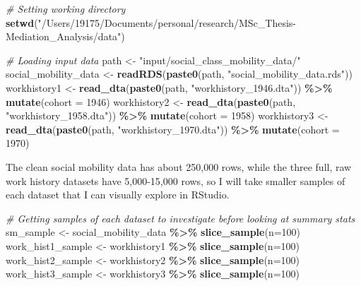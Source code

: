 \documentclass[
]{article}
\newenvironment{Shaded}{\begin{snugshade}}{\end{snugshade}}
\newcommand{\AttributeTok}[1]{\textcolor[rgb]{0.13,0.29,0.53}{#1}}
\newcommand{\CommentTok}[1]{\textcolor[rgb]{0.56,0.35,0.01}{\textit{#1}}}
\newcommand{\DecValTok}[1]{\textcolor[rgb]{0.00,0.00,0.81}{#1}}
\newcommand{\FunctionTok}[1]{\textcolor[rgb]{0.13,0.29,0.53}{\textbf{#1}}}
\newcommand{\NormalTok}[1]{#1}
\newcommand{\OtherTok}[1]{\textcolor[rgb]{0.56,0.35,0.01}{#1}}
\newcommand{\SpecialCharTok}[1]{\textcolor[rgb]{0.81,0.36,0.00}{\textbf{#1}}}
\newcommand{\StringTok}[1]{\textcolor[rgb]{0.31,0.60,0.02}{#1}}
\begin{document}
\begin{Shaded}
\begin{Highlighting}[]
\CommentTok{\# Setting working directory}
\FunctionTok{setwd}\NormalTok{(}\StringTok{"/Users/19175/Documents/personal/research/MSc\_Thesis{-}Mediation\_Analysis/data"}\NormalTok{)}

\CommentTok{\# Loading input data}
\NormalTok{path }\OtherTok{\textless{}{-}} \StringTok{"input/social\_class\_mobility\_data/"}
\NormalTok{social\_mobility\_data }\OtherTok{\textless{}{-}} \FunctionTok{readRDS}\NormalTok{(}\FunctionTok{paste0}\NormalTok{(path, }\StringTok{"social\_mobility\_data.rds"}\NormalTok{))}
\NormalTok{workhistory1 }\OtherTok{\textless{}{-}} \FunctionTok{read\_dta}\NormalTok{(}\FunctionTok{paste0}\NormalTok{(path, }\StringTok{"workhistory\_1946.dta"}\NormalTok{)) }\SpecialCharTok{\%\textgreater{}\%}
  \FunctionTok{mutate}\NormalTok{(}\AttributeTok{cohort =} \DecValTok{1946}\NormalTok{)}
\NormalTok{workhistory2 }\OtherTok{\textless{}{-}} \FunctionTok{read\_dta}\NormalTok{(}\FunctionTok{paste0}\NormalTok{(path, }\StringTok{"workhistory\_1958.dta"}\NormalTok{)) }\SpecialCharTok{\%\textgreater{}\%}
  \FunctionTok{mutate}\NormalTok{(}\AttributeTok{cohort =} \DecValTok{1958}\NormalTok{)}
\NormalTok{workhistory3 }\OtherTok{\textless{}{-}} \FunctionTok{read\_dta}\NormalTok{(}\FunctionTok{paste0}\NormalTok{(path, }\StringTok{"workhistory\_1970.dta"}\NormalTok{)) }\SpecialCharTok{\%\textgreater{}\%}
  \FunctionTok{mutate}\NormalTok{(}\AttributeTok{cohort =} \DecValTok{1970}\NormalTok{)}
\end{Highlighting}
\end{Shaded}

The clean social mobility data has about 250,000 rows, while the three
full, raw work history datasets have 5,000-15,000 rows, so I will take
smaller samples of each dataset that I can visually explore in RStudio.

\begin{Shaded}
\begin{Highlighting}[]
\CommentTok{\# Getting samples of each dataset to investigate before looking at summary stats}
\NormalTok{sm\_sample }\OtherTok{\textless{}{-}}\NormalTok{ social\_mobility\_data }\SpecialCharTok{\%\textgreater{}\%} \FunctionTok{slice\_sample}\NormalTok{(}\AttributeTok{n=}\DecValTok{100}\NormalTok{)}
\NormalTok{work\_hist1\_sample }\OtherTok{\textless{}{-}}\NormalTok{ workhistory1 }\SpecialCharTok{\%\textgreater{}\%} \FunctionTok{slice\_sample}\NormalTok{(}\AttributeTok{n=}\DecValTok{100}\NormalTok{)}
\NormalTok{work\_hist2\_sample }\OtherTok{\textless{}{-}}\NormalTok{ workhistory2 }\SpecialCharTok{\%\textgreater{}\%} \FunctionTok{slice\_sample}\NormalTok{(}\AttributeTok{n=}\DecValTok{100}\NormalTok{)}
\NormalTok{work\_hist3\_sample }\OtherTok{\textless{}{-}}\NormalTok{ workhistory3 }\SpecialCharTok{\%\textgreater{}\%} \FunctionTok{slice\_sample}\NormalTok{(}\AttributeTok{n=}\DecValTok{100}\NormalTok{)}
\end{Highlighting}
\end{Shaded}
\end{document}
